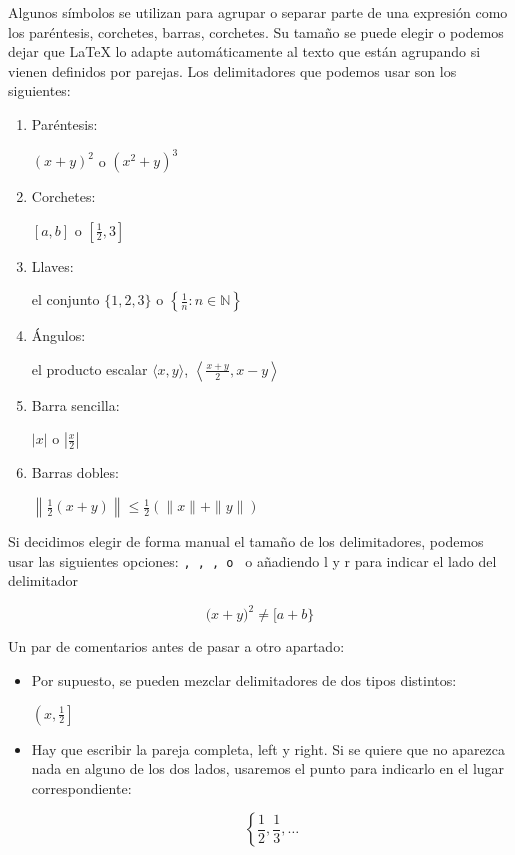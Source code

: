 \documentclass{article}
\numberwithin{equation}{section}
\theoremstyle{plain}
\theoremstyle{definition}
\theoremstyle{remark}
\begin{document}
Algunos símbolos se utilizan para agrupar o separar parte de una expresión como los paréntesis, corchetes, barras, corchetes. Su tamaño se puede elegir o podemos dejar que \LaTeX{} lo adapte automáticamente al texto que están agrupando si vienen definidos por parejas. Los delimitadores que podemos usar son los siguientes:
\begin{enumerate}
    \item Paréntesis: 
   	\begin{codigo-lado}
		$(x+y)^2$ o $\left( x^2+y \right)^3$
	\end{codigo-lado}
    \item Corchetes: 
    \begin{codigo-lado}
	    $[a,b]$ o $\left[ \frac{1}{2},3 \right]$
    \end{codigo-lado}
    \item Llaves: 
    \begin{codigo-arriba}
	    el conjunto $\{1,2,3\}$ o $\left\{ \frac{1}{n} : n \in \mathbb{N} \right\}$
    \end{codigo-arriba}
    \item Ángulos: 
    \begin{codigo-arriba}
	    el producto escalar $\langle x,y \rangle$, $\left\langle \frac{x+y}{2},x-y \right\rangle$
    \end{codigo-arriba}
    \item Barra sencilla: 
    \begin{codigo-lado}
    $|x|$ o $\left| \frac{x}{2} \right|$
    \end{codigo-lado}
    \item Barras dobles: 
    \begin{codigo-arriba}
    $\left\| \frac{1}{2} \left( x+y \right) \right\| \leq \frac{1}{2} \left( \| x \| + \|  y \| \right)$ 
    \end{codigo-arriba}
\end{enumerate}

Si decidimos elegir de forma manual el tamaño de los delimitadores, podemos usar las siguientes opciones: \texttt{\big, \Big, \bigg, o \Bigg} o añadiendo l y r para indicar el lado del delimitador 
\begin{codigo-arriba}
\[
(x+y \bigr)^{2} \neq \bigg[ a+b \Biggr\}
\]
\end{codigo-arriba}

Un par de comentarios antes de pasar a otro apartado:
\begin{itemize}
    \item Por supuesto, se pueden mezclar delimitadores de dos tipos distintos: 
    \begin{codigo-lado}
    	$\left(x,\frac{1}{2} \right]$
	\end{codigo-lado}
    \item Hay que escribir la pareja completa, left y right. Si se quiere que no aparezca nada en alguno de los dos lados, usaremos el punto para indicarlo en el lugar correspondiente:
    \begin{codigo-lado}
    \[ 
    \left\{ \frac{1}{2}, \frac{1}{3}, \ldots \right. 
    \]
    \end{codigo-lado}
\end{itemize}
\end{document}
